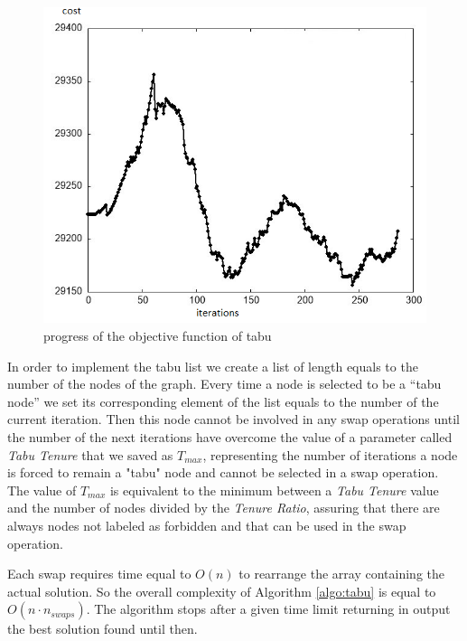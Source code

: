 \begin{figure}[!h]
    \centering
    \includegraphics[scale=0.8]{images/tabuperf.png}
    \caption{progress of the objective function of tabu}
    \label{fig:TABUPERF}
\end{figure}

In order to implement the tabu list we create a list of length equals to the number of the nodes of the graph. Every time a node is selected to be a “tabu node” we set its corresponding element of the list equals to the number of the current iteration. Then this node cannot be involved in any swap operations until the number of the next iterations have overcome the value of a parameter called \textit{Tabu Tenure} that we saved as $T_{max}$, representing the number of iterations a node is forced to remain a "tabu" node and cannot be selected in a swap operation.
The value of $T_{max}$ is equivalent to the minimum between a \textit{Tabu Tenure} value and the number of nodes divided by the \textit{Tenure Ratio}, assuring that there are always nodes not labeled as forbidden and that can be used in the swap operation.

Each swap requires time equal to $O(n)$ to rearrange the array containing the actual solution. So the overall complexity of Algorithm \ref{algo:tabu} is equal to $O(n \cdot n_{swaps})$.
The algorithm stops after a given time limit returning in output the best solution found until then.

